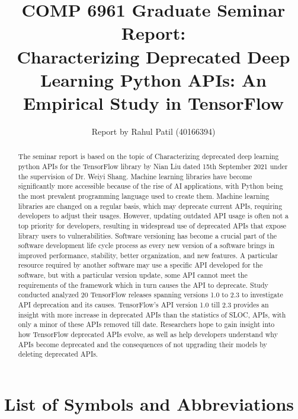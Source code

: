 \documentclass[12pt,letterpaper]{report}
\begin{document}
\title{COMP	6961 Graduate Seminar Report:\\[.5em]
Characterizing Deprecated Deep Learning Python APIs: An Empirical Study in TensorFlow }
\author{Report by Rahul Patil (40166394)}
\maketitle

\begin{abstract}

The seminar report is based on the topic of Characterizing deprecated deep learning python APIs for the TensorFlow library by Nian Liu dated 15th September 2021 under the supervision of Dr. Weiyi Shang. Machine learning libraries have become significantly more accessible because of the rise of AI applications, with Python being the most prevalent programming language used to create them. Machine learning libraries are changed on a regular basis, which may deprecate current APIs, requiring developers to adjust their usages. However, updating outdated API usage is often not a top priority for developers, resulting in widespread use of deprecated APIs that expose library users to vulnerabilities. Software versioning has become a crucial part of the software development life cycle process as every new version of a software brings in improved performance, stability, better organization, and new features. A particular resource required by another software may use a specific API developed for the software, but with a particular version update, some API cannot meet the requirements of the framework which in turn causes the API to deprecate. Study conducted analyzed 20 TensorFlow releases spanning versions 1.0 to 2.3 to investigate API deprecation and its causes. TensorFlow's API version 1.0 till 2.3 provides an insight with more increase in deprecated APIs than the statistics of SLOC, APIs, with only a minor of these APIs removed till date. Researchers hope to gain insight into how TensorFlow deprecated APIs evolve, as well as help developers understand why APIs become deprecated and the consequences of not upgrading their models by deleting deprecated APIs. 

\end{abstract}

\setcounter{page}{0}

\tableofcontents

\chapter*{List of Symbols and Abbreviations}
\end{document}

